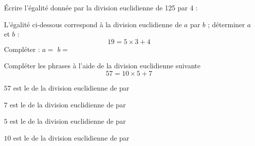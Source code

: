 \begin{myenumerate}
    \item \'Ecrire l'égalité donnée par la division euclidienne de
    125 par 4 : \dotfill
    \item L'égalité ci-dessous correspond à la division euclidienne
    de $a$ par $b$ ; déterminer $a$ et $b$ :
    \[19=5\times 3 + 4\]
    Compléter : \hfill $a=$ \dotfill \hfill $b=$ \dotfill \hfill
    \item Compléter les phrases à l'aide de la division euclidienne suivante
    \[57=10\times 5 +7\]


    $57$ est le \dotfill de la division euclidienne de
    \dotfill par \dotfill \vskip 0.3cm

    $7$ est le \dotfill de la division euclidienne de
    \dotfill par \dotfill \vskip 0.3cm

    $5$ est le \dotfill de la division euclidienne de
    \dotfill par \dotfill \vskip 0.3cm

    $10$ est le \dotfill de la division euclidienne de
    \dotfill par \dotfill \vskip 0.3cm

\end{myenumerate}